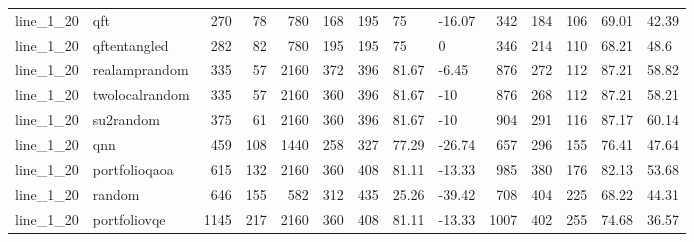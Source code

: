 \begin{longtable}{llrrrrlllrrlll}
line\_1\_20 & qft & 270 & 78 & 780 & 168 & 195 & 75 & -16.07 & 342 & 184 & 106 & 69.01 & 42.39 \\
line\_1\_20 & qftentangled & 282 & 82 & 780 & 195 & 195 & 75 & 0 & 346 & 214 & 110 & 68.21 & 48.6 \\
line\_1\_20 & realamprandom & 335 & 57 & 2160 & 372 & 396 & 81.67 & -6.45 & 876 & 272 & 112 & 87.21 & 58.82 \\
line\_1\_20 & twolocalrandom & 335 & 57 & 2160 & 360 & 396 & 81.67 & -10 & 876 & 268 & 112 & 87.21 & 58.21 \\
line\_1\_20 & su2random & 375 & 61 & 2160 & 360 & 396 & 81.67 & -10 & 904 & 291 & 116 & 87.17 & 60.14 \\
line\_1\_20 & qnn & 459 & 108 & 1440 & 258 & 327 & 77.29 & -26.74 & 657 & 296 & 155 & 76.41 & 47.64 \\
line\_1\_20 & portfolioqaoa & 615 & 132 & 2160 & 360 & 408 & 81.11 & -13.33 & 985 & 380 & 176 & 82.13 & 53.68 \\
line\_1\_20 & random & 646 & 155 & 582 & 312 & 435 & 25.26 & -39.42 & 708 & 404 & 225 & 68.22 & 44.31 \\
line\_1\_20 & portfoliovqe & 1145 & 217 & 2160 & 360 & 408 & 81.11 & -13.33 & 1007 & 402 & 255 & 74.68 & 36.57 \\
\end{longtable}
